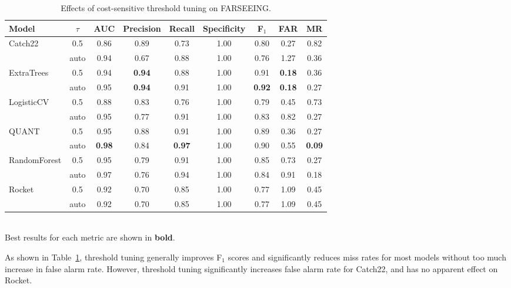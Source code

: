 \documentclass[runningheads]{llncs}
\begin{document}
\begin{table}[h]
\centering
\caption{Effects of cost-sensitive threshold tuning on FARSEEING.} \label{tab:tuning-results}
\begin{tabularx}{0.9\textwidth}{l  @{\extracolsep{\fill}}  c  @{\extracolsep{\fill}}  c  @{\extracolsep{\fill}}  c  @{\extracolsep{\fill}}  c  @{\extracolsep{\fill}}  c @{\extracolsep{\fill}}  c @{\extracolsep{\fill}}  c @{\extracolsep{\fill}}  c}
\toprule
Model & $\tau$ & AUC & Precision & Recall & Specificity & F$_1$ & FAR & MR \\
\midrule
\multirow{2}{*}{Catch22} & 0.5 & 0.86 & 0.89 & 0.73 & 1.00 & 0.80 & 0.27 & 0.82 \\
 & auto & 0.94 & 0.67 & 0.88 & 1.00 & 0.76 & 1.27 & 0.36 \\
 \hline
\multirow{2}{*}{ExtraTrees} & 0.5 & 0.94 & \textbf{0.94} & 0.88 & 1.00 & 0.91 & \textbf{0.18} & 0.36 \\
 & auto & 0.95 & \textbf{0.94} & 0.91 & 1.00 & \textbf{0.92} & \textbf{0.18} & 0.27 \\ \hline
\multirow{2}{*}{LogisticCV} & 0.5 & 0.88 & 0.83 & 0.76 & 1.00 & 0.79 & 0.45 & 0.73 \\
 & auto & 0.95 & 0.77 & 0.91 & 1.00 & 0.83 & 0.82 & 0.27 \\ \hline
\multirow{2}{*}{QUANT} & 0.5 & 0.95 & 0.88 & 0.91 & 1.00 & 0.89 & 0.36 & 0.27 \\
 & auto & \textbf{0.98} & 0.84 & \textbf{0.97} & 1.00 & 0.90 & 0.55 & \textbf{0.09} \\ \hline
\multirow{2}{*}{RandomForest} & 0.5 & 0.95 & 0.79 & 0.91 & 1.00 & 0.85 & 0.73 & 0.27 \\
 & auto & 0.97 & 0.76 & 0.94 & 1.00 & 0.84 & 0.91 & 0.18 \\ \hline
\multirow{2}{*}{Rocket} & 0.5 & 0.92 & 0.70 & 0.85 & 1.00 & 0.77 & 1.09 & 0.45 \\
 & auto & 0.92 & 0.70 & 0.85 & 1.00 & 0.77 & 1.09 & 0.45 \\
\bottomrule
\end{tabularx}\\
Best results for each metric are shown in \textbf{bold}.
\end{table}

As shown in Table~\ref{tab:tuning-results}, threshold tuning generally improves F$_1$ scores and significantly reduces miss rates for most models without too much increase in false alarm rate. However, threshold tuning significantly increases false alarm rate for Catch22, and has no apparent effect on Rocket. 
\end{document}
